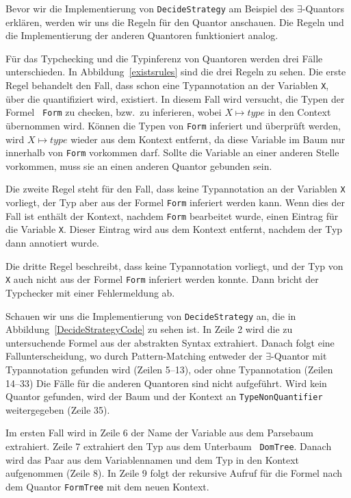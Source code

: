 Bevor wir die Implementierung von {\tt DecideStrategy} am Beispiel des
$\exists$-Quantors erkl\"aren, werden wir uns die Regeln f\"ur den
Quantor anschauen. Die Regeln und die Implementierung der anderen
Quantoren funktioniert analog.

F\"ur das Typchecking und die Typinferenz von Quantoren werden drei
F\"alle unterschieden. In Abbildung~\ref{existsrules} sind die drei
Regeln zu sehen. Die erste Regel behandelt den Fall, dass schon eine
Typannotation an der Variablen {\tt X}, \"uber die quantifiziert wird,
existiert. In diesem Fall wird versucht, die Typen der Formel {\tt
  Form} zu checken, bzw.\ zu inferieren, wobei $X \mapsto
\mathit{type}$ in den Context \"ubernommen wird. K\"onnen die Typen
von {\tt Form} inferiert und \"uberpr\"uft werden, wird $X \mapsto
\mathit{type}$ wieder aus dem Kontext entfernt, da diese Variable im
Baum nur innerhalb von {\tt Form} vorkommen darf. Sollte die Variable
an einer anderen Stelle vorkommen, muss sie an einen anderen
Quantor gebunden sein.

Die zweite Regel steht f\"ur den Fall, dass keine Typannotation an der
Variablen {\tt X} vorliegt, der Typ aber aus der Formel {\tt Form}
inferiert werden kann. Wenn dies der Fall ist enth\"alt der Kontext,
nachdem {\tt Form} bearbeitet wurde, einen Eintrag f\"ur die Variable
{\tt X}. Dieser Eintrag wird aus dem Kontext entfernt, nachdem der Typ
dann annotiert wurde.

Die dritte Regel beschreibt, dass keine Typannotation vorliegt, und
der Typ von {\tt X} auch nicht aus der Formel {\tt Form} inferiert
werden konnte. Dann bricht der Typchecker mit einer Fehlermeldung ab.

Schauen wir uns die Implementierung von {\tt DecideStrategy} an, die
in Abbildung~\ref{DecideStrategyCode} zu sehen ist. In Zeile 2 wird
die zu untersuchende Formel aus der abstrakten Syntax extrahiert.
Danach folgt eine Fallunterscheidung, wo durch Pattern-Matching
entweder der $\exists$-Quantor mit Typannotation gefunden wird (Zeilen
5--13), oder ohne Typannotation (Zeilen 14--33) Die F\"alle f\"ur die
anderen Quantoren sind nicht aufgef\"uhrt. Wird kein Quantor gefunden,
wird der Baum und der Kontext an {\tt TypeNonQuantifier} weitergegeben
(Zeile 35).

Im ersten Fall wird in Zeile 6 der Name der Variable aus dem Parsebaum
extrahiert. Zeile 7 extrahiert den Typ aus dem Unterbaum {\tt
  DomTree}.  Danach wird das Paar aus dem Variablennamen und dem Typ
in den Kontext aufgenommen (Zeile 8). In Zeile 9 folgt der rekursive
Aufruf f\"ur die Formel nach dem Quantor {\tt FormTree} mit dem neuen
Kontext.

